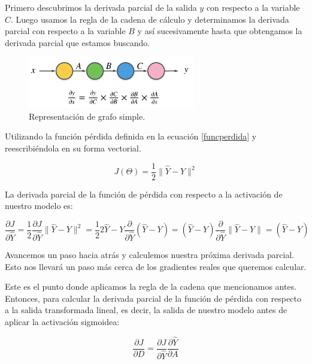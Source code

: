 \documentclass[a4paper,12pt]{article}
\begin{document}
Primero descubrimos la derivada parcial de la salida $y$ con respecto a la variable $C$. Luego usamos la regla de la cadena de cálculo y determinamos la derivada parcial con respecto a la variable $B$ y así sucesivamente hasta que obtengamos la derivada parcial que estamos buscando.

\begin{figure}[H]
	\begin{center}				
	\includegraphics[width=0.65\textwidth]{025.png}
  	\caption{Representación de grafo simple.}
  	\label{fig:func}
  	\end{center}
\end{figure}

Utilizando la función pérdida definida en la ecuación \ref{funcperdida} y reescribiéndola en su forma vectorial.

\begin{equation}
J(\Theta)=\frac{1}{2} \|\hat{Y}-Y\|^2
\end{equation}

La derivada parcial de la función de pérdida con respecto a la activación de nuestro modelo es:

\begin{equation}
\frac{\partial J}{\partial \hat{Y}}
=\frac{1}{2} \frac{\partial J}{\partial \hat{Y}} \|\hat{Y}-Y\|^2 = \frac{1}{2} 2 \hat{Y} - Y \frac{\partial}{\partial \hat{Y}} (\hat{Y}-Y) = (\hat{Y}-Y) \frac{\partial}{\partial \hat{Y}} \|\hat{Y}-Y\| = (\hat{Y} - Y)
\label{dj/dy}
\end{equation}

Avancemos un paso hacia atrás y calculemos nuestra próxima derivada parcial. Esto nos llevará un paso más cerca de los gradientes reales que queremos calcular.

Este es el punto donde aplicamos la regla de la cadena que mencionamos antes. Entonces, para calcular la derivada parcial de la función de pérdida con respecto a la salida transformada lineal, es decir, la salida de nuestro modelo antes de aplicar la activación sigmoidea:

\begin{equation}
\frac{\partial J}{\partial D} = \frac{\partial J}{\partial \hat{Y}} \frac{\partial \hat{Y}}{\partial A}
\label{dJdD}
\end{equation}
\end{document}
